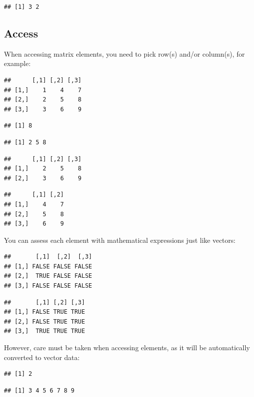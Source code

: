 \documentclass[
]{book}
\begin{document}
\begin{verbatim}
## [1] 3 2
\end{verbatim}

\hypertarget{access-1}{%
\subsection{Access}\label{access-1}}

When accessing matrix elements, you need to pick row(s) and/or column(s), for example:

\begin{verbatim}
##      [,1] [,2] [,3]
## [1,]    1    4    7
## [2,]    2    5    8
## [3,]    3    6    9
\end{verbatim}

\begin{verbatim}
## [1] 8
\end{verbatim}

\begin{verbatim}
## [1] 2 5 8
\end{verbatim}

\begin{verbatim}
##      [,1] [,2] [,3]
## [1,]    2    5    8
## [2,]    3    6    9
\end{verbatim}

\begin{verbatim}
##      [,1] [,2]
## [1,]    4    7
## [2,]    5    8
## [3,]    6    9
\end{verbatim}

You can assess each element with mathematical expressions just like vectors:

\begin{verbatim}
##       [,1]  [,2]  [,3]
## [1,] FALSE FALSE FALSE
## [2,]  TRUE FALSE FALSE
## [3,] FALSE FALSE FALSE
\end{verbatim}

\begin{verbatim}
##       [,1] [,2] [,3]
## [1,] FALSE TRUE TRUE
## [2,] FALSE TRUE TRUE
## [3,]  TRUE TRUE TRUE
\end{verbatim}

However, care must be taken when accessing elements, as it will be automatically converted to vector data:

\begin{verbatim}
## [1] 2
\end{verbatim}

\begin{verbatim}
## [1] 3 4 5 6 7 8 9
\end{verbatim}
\end{document}
